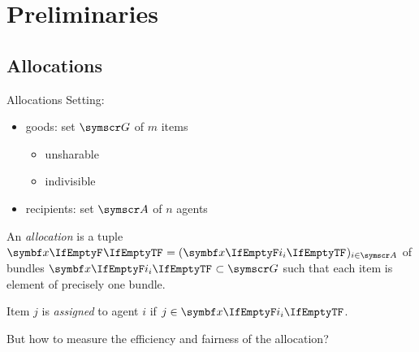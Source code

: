 \section{Preliminaries}

\subsection{Allocations}
\begin{frame}{Allocations}
	Setting:
	\begin{itemize}
		\item
		goods: set \(\goods\) of \(m\) items
		\begin{itemize}
			\item
			unsharable

			\item
			indivisible
		\end{itemize}

		\item
		recipients: set \(\agents\) of \(n\) agents
	\end{itemize}
	\begin{definition}
		An \emph{allocation} is a tuple
		\(\alloc[][] = (\alloc)_{i \in \agents}\)
		of bundles \(\alloc \subset \goods\) such that each item is element of precisely one bundle.

		Item \(j\) is \emph{assigned} to agent \(i\) if \(j \in \alloc\).
	\end{definition}

	But how to measure the efficiency and fairness of the allocation?
\end{frame}

